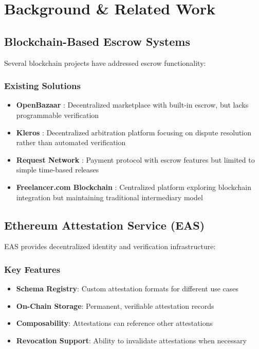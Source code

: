 \documentclass[12pt,a4paper]{article}
\begin{document}
\section{Background \& Related Work}

\subsection{Blockchain-Based Escrow Systems}

Several blockchain projects have addressed escrow functionality:

\subsubsection{Existing Solutions}
\begin{itemize}
    \item \textbf{OpenBazaar} \cite{hoffman2016openbazaar}: Decentralized marketplace with built-in escrow, but lacks programmable verification
    \item \textbf{Kleros} \cite{ast2018kleros}: Decentralized arbitration platform focusing on dispute resolution rather than automated verification
    \item \textbf{Request Network} \cite{request2017}: Payment protocol with escrow features but limited to simple time-based releases
    \item \textbf{Freelancer.com Blockchain} \cite{freelancer2017}: Centralized platform exploring blockchain integration but maintaining traditional intermediary model
\end{itemize}

\subsection{Ethereum Attestation Service (EAS)}

EAS provides decentralized identity and verification infrastructure:

\subsubsection{Key Features}
\begin{itemize}
    \item \textbf{Schema Registry}: Custom attestation formats for different use cases
    \item \textbf{On-Chain Storage}: Permanent, verifiable attestation records
    \item \textbf{Composability}: Attestations can reference other attestations
    \item \textbf{Revocation Support}: Ability to invalidate attestations when necessary
\end{itemize}
\end{document}
